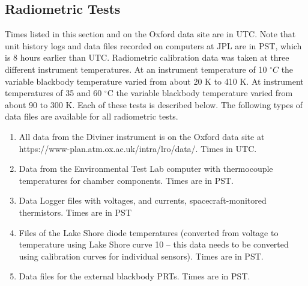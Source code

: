 \subsection{Radiometric Tests}
Times listed in this section and on the Oxford data site are in UTC.
Note that unit history logs and data files recorded on computers at JPL are in PST, which is 8 hours earlier than UTC.
Radiometric calibration data was taken at three different instrument temperatures.
At an instrument temperature of 10 $^\circ C$ the variable blackbody temperature varied from about 20 K to 410 K.
At instrument temperatures of 35 and 60 $^\circ$C the variable blackbody temperature varied from about 90 to 300 K.
Each of these tests is described below.
The following types of data files are available for all radiometric tests.

\begin{enumerate}
\item All data from the Diviner instrument is on the Oxford data site at https://www-plan.atm.ox.ac.uk/intra/lro/data/. Times in UTC.
\item Data from the Environmental Test Lab computer with thermocouple temperatures for chamber components. Times are in PST.
\item Data Logger files with voltages, and currents, spacecraft-monitored thermistors. Times are in PST
\item Files of the Lake Shore diode temperatures (converted from voltage to temperature using Lake Shore curve 10 – this data needs to be converted using calibration curves for individual sensors). Times are in PST.
\item Data files for the external blackbody PRTs. Times are in PST.
\end{enumerate}


